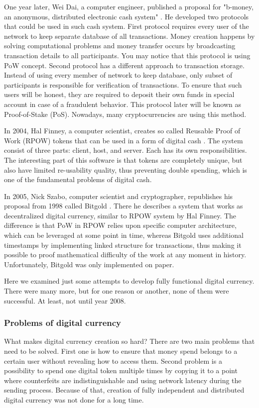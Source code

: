 \documentclass[conference,compsoc]{IEEEtran}
\begin{document}
One year later, Wei Dai, a computer engineer, published a proposal for "b-money, an anonymous, distributed electronic cash system" \cite{bmoney}. He developed two protocols that could be used in such cash system. First protocol requires every user of the network to keep separate database of all transactions. Money creation happens by solving computational problems and money transfer occurs by broadcasting transaction details to all participants. You may notice that this protocol is using PoW concept. Second protocol has a different approach to transaction storage. Instead of using every member of network to keep database, only subset of participants is responsible for verification of transactions. To ensure that such users will be honest, they are required to deposit their own funds in special account in case of a fraudulent behavior. This protocol later will be known as Proof-of-Stake (PoS). Nowadays, many cryptocurrencies are using this method. 

In 2004, Hal Finney, a computer scientist, creates so called Reusable Proof of Work (RPOW) tokens that can be used in a form of digital cash \cite{rpow}. 
The system consist of three parts: client, host, and server. Each has its own responsibilities. 
The interesting part of this software is that tokens are completely unique, but also have limited re-usability quality, thus preventing double spending, which is one of the fundamental problems of digital cash. 

In 2005, Nick Szabo, computer scientist and cryptographer, republishes his proposal from 1998 called Bitgold \cite{bitgold}. 
There he describes a system that works as decentralized digital currency, similar to RPOW system by Hal Finney. 
The difference is that PoW in RPOW relies upon specific computer architecture, which can be leveraged at some point in time, whereas Bitgold uses additional timestamps by implementing linked structure for transactions, thus making it possible to proof mathematical difficulty of the work at any moment in history. 
Unfortunately, Bitgold was only implemented on paper.

Here we examined just some attempts to develop fully functional digital currency. 
There were many more, but for one reason or another, none of them were successful. 
At least, not until year 2008. 

\subsubsection{Problems of digital currency}
What makes digital currency creation so hard? There are two main problems that need to be solved. 
First one is how to ensure that money spend belongs to a certain user without revealing how to access them. 
Second problem is a possibility to spend one digital token multiple times by copying it to a point where counterfeits are indistinguishable and using network latency during the sending process. 
Because of that, creation of fully independent and distributed digital currency was not done for a long time. 
\end{document}
